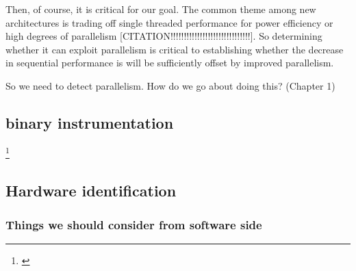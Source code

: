 \documentclass[12pt,twoside]{reedthesis}
\begin{document}
		Then, of course, it is critical for our goal. The common theme among new architectures is trading off single threaded performance for power efficiency or high degrees of parallelism [CITATION!!!!!!!!!!!!!!!!!!!!!!!!!!!!!!].
		So determining whether it can exploit parallelism is critical to establishing whether the decrease in sequential performance is will be sufficiently offset by improved parallelism. 
		
		So we need to detect parallelism. How do we go about doing this? (Chapter 1)
		
	\subsection{binary instrumentation}
		\footnote{\cite{Luk:2005}}
		
	\subsection{Hardware identification}
	
	\subsubsection{Things we should consider from software side}
	
\end{document}
